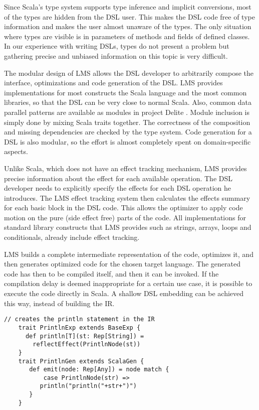 Since Scala's type system supports type inference and implicit conversions, most
of the  types are hidden from the DSL user. This makes the DSL code
free of type information and makes the user almost unaware of the 
types. The only situation where  types are visible is in
parameters of methods and fields of defined classes. In our experience
with writing DSLs,  types do not present a problem but gathering
precise and unbiased information on this topic is very difficult.

The modular design of LMS allows the DSL developer to arbitrarily compose the
interface, optimizations and code generation of the DSL. LMS provides
implementations for most constructs the Scala language and the most common
libraries, so that the DSL can be very close to normal Scala. Also, common data
parallel patterns are available as modules in project Delite \cite{dsl11}.
Module inclusion is simply done by mixing Scala traits together. The correctness
of the composition and missing dependencies are checked by the type system. Code
generation for a DSL is also modular, so the effort is almost completely spent
on domain-specific aspects.

Unlike Scala, which does not have an effect tracking mechanism, LMS provides
precise information about the effect for each available operation. The DSL
developer needs to explicitly specify the effects for each DSL operation he
introduces. The LMS effect tracking system then calculates the effects summary
for each basic block in the DSL code. This allows the optimizer to apply code
motion on the pure (side effect free) parts of the code. All implementations for
standard library constructs that LMS provides such as strings, arrays, loops and
conditionals, already include effect tracking.

LMS builds a complete intermediate representation of the code, optimizes it, and then generates optimized code for the chosen target language. The generated code has then to be compiled itself, and then it can be invoked. If the compilation delay is deemed inappropriate for a certain use case, it is possible to execute the code directly in Scala. A shallow DSL embedding can be achieved this way, instead of building the IR.

\begin{lstlisting}[name=code, caption=Example of how the DSL module is specified. This module is used for measuring a performance of a block of code and can be reused in any other Scala backed DSL. ,captionpos=b, label=lst:println_dsl, float=t]
    // creates the println statement in the IR
    trait PrintlnExp extends BaseExp {
      def println[T](st: Rep[String]) =
        reflectEffect(PrintlnNode(st)) 
    }
    trait PrintlnGen extends ScalaGen {
       def emit(node: Rep[Any]) = node match {
           case PrintlnNode(str) =>
	      println("println("+str+")")
       }
    }
\end{lstlisting}

